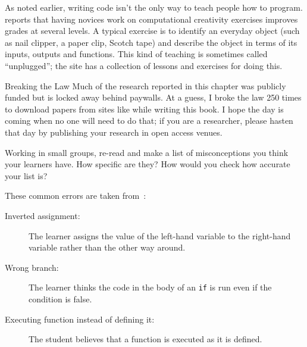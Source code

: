 As noted earlier, writing code isn't the only way to teach people how to program. \cite{Shel2017} reports that having novices work on computational creativity exercises improves grades at several levels. A typical exercise is to identify an everyday object (such as nail clipper, a paper clip, Scotch tape) and describe the object in terms of its inputs, outputs and functions. This kind of teaching is sometimes called ``unplugged''; the  site has a collection of lessons and exercises for doing this.

\begin{aside}{Breaking the Law}
  Much of the research reported in this chapter was publicly funded
  but is locked away behind paywalls.
  At a guess,
  I broke the law 250 times to download papers from sites like 
  while writing this book.
  I hope the day is coming when no one will need to do that;
  if you are a researcher,
  please hasten that day by publishing your research in open access venues.
\end{aside}



Working in small groups,
re-read  and make a list of misconceptions you think your learners have.
How specific are they?
How would you check how accurate your list is?


These common errors are taken from~\cite{Sirk2012}:

\begin{description}

\item[Inverted assignment:]
  The learner assigns the value of the left-hand variable to the right-hand variable
  rather than the other way around.

\item[Wrong branch:]
  The learner thinks the code in the body of an \texttt{if} is run
  even if the condition is false.

\item[Executing function instead of defining it:]
  The student believes that a function is executed as it is defined.

\end{description}

